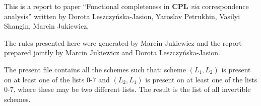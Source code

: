 \documentclass[11pt]{article}
\begin{document}
This is a report to paper ``Functional completeness in \textbf{CPL} \textit{via} correspondence analysis'' written by Dorota Leszczy\'{n}ska-Jasion, 
Yaroslav Petrukhin, Vasilyi Shangin, Marcin Jukiewicz. 

The rules presented here were generated by Marcin Jukiewicz and the report prepared jointly by Marcin Jukiewicz and Dorota Leszczy\'{n}ska-Jasion.

The present file contains all the schemes such that: scheme $(L_1, L_2)$ is present on at least one of the lists 0-7 and $(L_2, L_1)$ is present on at least one of the lists 0-7, where these may be two different lists. The result is the list of all invertible schemes.

\bigskip

\begin{center}


\end{center}
\end{document}
